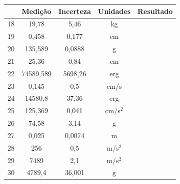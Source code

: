 \begin{center}
  \begin{tabular}{|c | c | c | c |>{ \centering\arraybackslash}m{8cm} |}  \hline
    & Medição	& Incerteza	& Unidades	& Resultado \\ \hline	 
18 & 19,78 & 5,46 & kg & \\ \hline
19 & 0,458 & 0,177 & cm & \\ \hline
20 & 135,589 & 0,0888 & g & \\ \hline
21 & 25,36 & 0,84 & cm & \\ \hline
22 & 74589,589 & 5698,26 & erg & \\ \hline
23 & 0,145 & 0,5 & cm/s & \\ \hline
24 & 14580,8 & 37,36 & erg & \\ \hline
25 & 125,369 & 0,041 & cm/s$^2$ & \\ \hline
26 & 74,58 & 3,14 & g & \\ \hline
27 & 0,025 & 0,0074 & m & \\ \hline
28 & 256 & 0,5 & m/s$^2$ & \\ \hline
29 & 7489 & 2,1 & m/s$^2$ & \\ \hline
30 & 4789,4 & 36,001 & g & \\ \hline
  \end{tabular}
\end{center}
